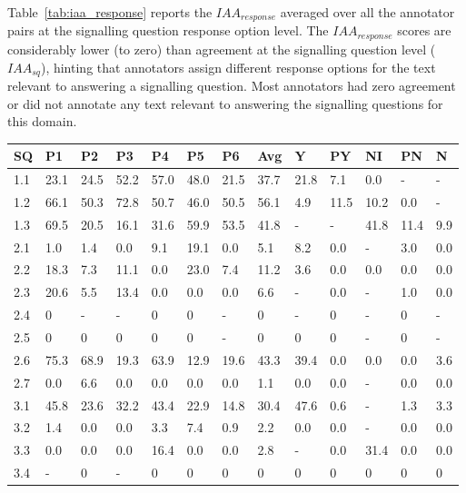 \documentclass{IOS-Book-Article}
\begin{document}
Table~\ref{tab:iaa_response} reports the $IAA_{response}$ averaged over all the annotator pairs at the signalling question response option level.
The $IAA_{response}$ scores are considerably lower (to zero) than agreement at the signalling question level ($IAA_{sq}$), hinting that annotators assign different response options for the text relevant to answering a signalling question. 
Most annotators had zero agreement or did not annotate any text relevant to answering the signalling questions for this domain.


\begin{table}[!ht]
    \centering
    \begin{tabular}{|l||l|l|l|l|l|l|l||l|l|l|l|l|}
    \hline
        SQ & P1 & P2 & P3 & P4 & P5 & P6 & Avg & Y & PY & NI & PN & N \\ \hline \hline
        1.1 & 23.1 & 24.5 & 52.2 & 57.0 & 48.0 & 21.5 & 37.7 & 21.8 & 7.1 & 0.0 & - & - \\ 
        1.2 & 66.1 & 50.3 & 72.8 & 50.7 & 46.0 & 50.5 & 56.1 & 4.9 & 11.5 & 10.2 & 0.0 & - \\ 
        1.3 & 69.5 & 20.5 & 16.1 & 31.6 & 59.9 & 53.5 & 41.8 & - & - & 41.8 & 11.4 & 9.9 \\ \hline
        2.1 & 1.0 & 1.4 & 0.0 & 9.1 & 19.1 & 0.0 & 5.1 & 8.2 & 0.0 & - & 3.0 & 0.0 \\ 
        2.2 & 18.3 & 7.3 & 11.1 & 0.0 & 23.0 & 7.4 & 11.2 & 3.6 & 0.0 & 0.0 & 0.0 & 0.0 \\ 
        2.3 & 20.6 & 5.5 & 13.4 & 0.0 & 0.0 & 0.0 & 6.6 & - & 0.0 & - & 1.0 & 0.0 \\ 
        2.4 & 0 & - & - & 0 & 0 & - & 0 & - & 0 & - & 0 & - \\ 
        2.5 & 0 & 0 & 0 & 0 & 0 & - & 0 & 0 & 0 & - & 0 & - \\ 
        2.6 & 75.3 & 68.9 & 19.3 & 63.9 & 12.9 & 19.6 & 43.3 & 39.4 & 0.0 & 0.0 & 0.0 & 3.6 \\ 
        2.7 & 0.0 & 6.6 & 0.0 & 0.0 & 0.0 & 0.0 & 1.1 & 0.0 & 0.0 & - & 0.0 & 0.0 \\ \hline
        3.1 & 45.8 & 23.6 & 32.2 & 43.4 & 22.9 & 14.8 & 30.4 & 47.6 & 0.6 & - & 1.3 & 3.3 \\ 
        3.2 & 1.4 & 0.0 & 0.0 & 3.3 & 7.4 & 0.9 & 2.2 & 0.0 & 0.0 & - & 0.0 & 0.0 \\ 
        3.3 & 0.0 & 0.0 & 0.0 & 16.4 & 0.0 & 0.0 & 2.8 & - & 0.0 & 31.4 & 0.0 & 0.0 \\ 
        3.4 & - & 0 & - & 0 & 0 & 0 & 0 & 0 & 0 & 0 & 0 & 0 \\ \hline

\end{tabular}
\end{table}
\end{document}
